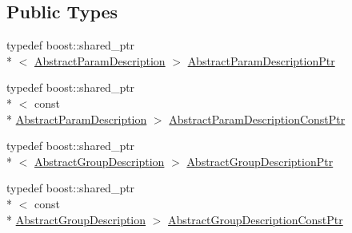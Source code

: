 \subsection*{Public Types}
\begin{DoxyCompactItemize}
\item 
typedef boost\-::shared\-\_\-ptr\\*
$<$ \hyperlink{classnubot__gazebo_1_1NubotGazeboConfig_1_1AbstractParamDescription}{Abstract\-Param\-Description} $>$ \hyperlink{classnubot__gazebo_1_1NubotGazeboConfig_a4d37d54db4abe22adcf2c85ad73cd80b}{Abstract\-Param\-Description\-Ptr}
\item 
typedef boost\-::shared\-\_\-ptr\\*
$<$ const \\*
\hyperlink{classnubot__gazebo_1_1NubotGazeboConfig_1_1AbstractParamDescription}{Abstract\-Param\-Description} $>$ \hyperlink{classnubot__gazebo_1_1NubotGazeboConfig_a25b01b079fefa04f8d43df7d664dedac}{Abstract\-Param\-Description\-Const\-Ptr}
\item 
typedef boost\-::shared\-\_\-ptr\\*
$<$ \hyperlink{classnubot__gazebo_1_1NubotGazeboConfig_1_1AbstractGroupDescription}{Abstract\-Group\-Description} $>$ \hyperlink{classnubot__gazebo_1_1NubotGazeboConfig_a8928f69a981b3b29926843b70c9cb8d4}{Abstract\-Group\-Description\-Ptr}
\item 
typedef boost\-::shared\-\_\-ptr\\*
$<$ const \\*
\hyperlink{classnubot__gazebo_1_1NubotGazeboConfig_1_1AbstractGroupDescription}{Abstract\-Group\-Description} $>$ \hyperlink{classnubot__gazebo_1_1NubotGazeboConfig_aad0e4fda22f4c6a048f65a3de2f94c95}{Abstract\-Group\-Description\-Const\-Ptr}
\end{DoxyCompactItemize}

